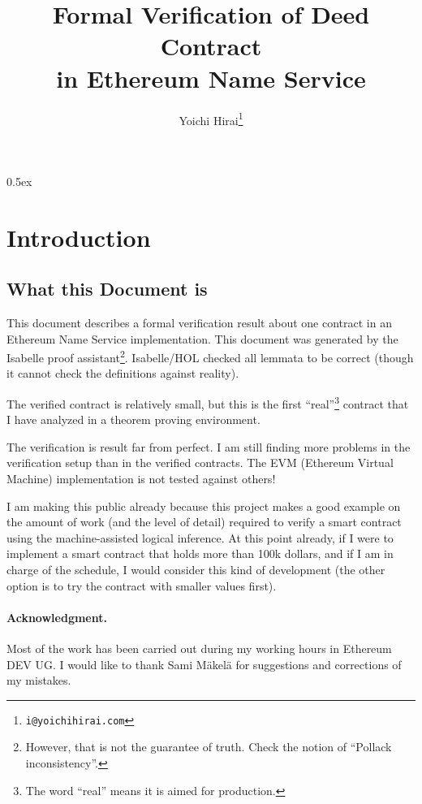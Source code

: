 \documentclass[11pt,a4paper]{article}
\begin{document}
\title{Formal Verification of Deed Contract\\in Ethereum Name Service}
\author{Yoichi Hirai\footnote{\texttt{i@yoichihirai.com}}}
\maketitle

\tableofcontents

\parindent 0pt\parskip 0.5ex

\newpage

\section{Introduction}

\subsection{What this Document is}
This document describes a formal verification result about one contract in
an Ethereum Name Service implementation.
This document was generated by the Isabelle proof assistant\footnote{However, that is not the guarantee of truth.  Check the notion of ``Pollack inconsistency''.}.
Isabelle/HOL checked all lemmata to be correct (though it cannot check the definitions against reality).

The verified contract is relatively small,
but this is the first ``real''\footnote{The word ``real'' means it is aimed for production.}
contract that I have analyzed in a theorem proving environment.

The verification is result far from perfect.
I am still finding more problems in the verification setup than in the verified contracts.
The EVM (Ethereum Virtual Machine) implementation is not tested against others!

I am making this public already because this project makes a
good example on the amount of work (and the level of detail) required to
verify a smart contract using the machine-assisted logical inference.  At this
point already, if I were to
implement a smart contract that holds more than 100k dollars, and if
I am in charge of the schedule, I would consider this kind of
development (the other option is to try the contract with smaller values first).

\paragraph{Acknowledgment.}
Most of the work has been carried out during my working hours in Ethereum DEV UG.
I would like to thank Sami M\"akel\"a for suggestions and corrections of my mistakes.
\end{document}
